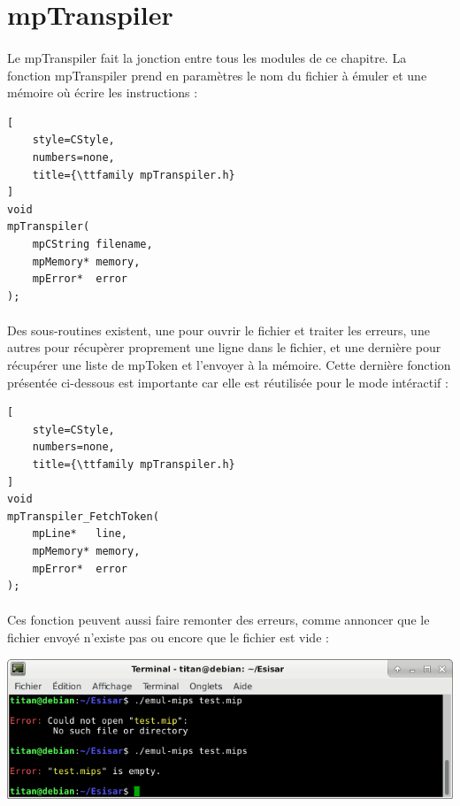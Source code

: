 \documentclass[12pt]{report} %
\begin{document}
\section{mpTranspiler}
\label{section_mpTranspiler}

\paragraph{}
Le {\ttfamily mpTranspiler} fait la jonction entre tous les modules de ce chapitre. La fonction {\ttfamily mpTranspiler} prend en paramètres le nom du fichier à émuler et une mémoire où écrire les instructions :

\begin{lstlisting}[
    style=CStyle,
    numbers=none,
    title={\ttfamily mpTranspiler.h}
]
void
mpTranspiler(
    mpCString filename,
    mpMemory* memory,
    mpError*  error
);
\end{lstlisting}

\paragraph{}
Des sous-routines existent, une pour ouvrir le fichier et traiter les erreurs, une autres pour récupèrer proprement une ligne dans le fichier, et une dernière pour récupérer une liste de {\ttfamily mpToken} et l'envoyer à la mémoire. Cette dernière fonction présentée ci-dessous est importante car elle est réutilisée pour le mode intéractif :

\begin{lstlisting}[
    style=CStyle,
    numbers=none,
    title={\ttfamily mpTranspiler.h}
]
void
mpTranspiler_FetchToken(
    mpLine*   line,
    mpMemory* memory,
    mpError*  error
);
\end{lstlisting}

\paragraph{}
Ces fonction peuvent aussi faire remonter des erreurs, comme annoncer que le fichier envoyé n'existe pas ou encore que le fichier est vide :

\begin{center}
    \includegraphics[width=\textwidth]{MIPS-mpTranspiler.png}
\end{center}
\end{document}

